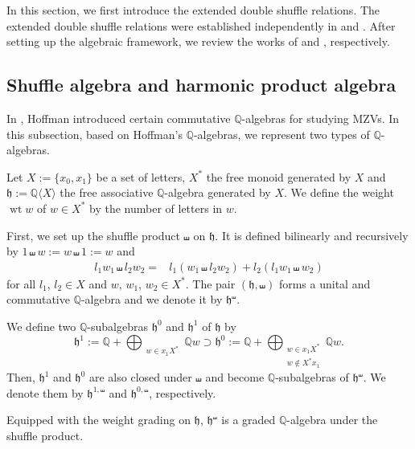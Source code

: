 \documentclass[15pt,oneside,reqno]{amsart}
\theoremstyle{remark}{
\newtheorem{lem}[df]{Lemma}
\newtheorem{prop}[df]{Proposition}
\newtheorem{ex}[df]{Example}
\newtheorem{rmk}[df]{Remark}
}
\DeclareMathOperator{\Span}{Span}
\newcommand{\ide}[1]{\mathfrak{#1}}
\newcommand{\Q}{\mathbb{Q}}
\DeclareMathOperator{\wt}{wt}
\begin{document}
In this section, we first introduce the extended double shuffle relations.
The extended double shuffle relations were established independently in \cite{Ihara-Kaneko-Zagier} and \cite{Racinet}.
After setting up the algebraic framework, we review the works of \cite{Ihara-Kaneko-Zagier} and \cite{Racinet}, respectively.

\subsection{Shuffle algebra and harmonic product algebra}

In \cite{Hoffman}, Hoffman introduced certain commutative $\mathbb{Q}$-algebras for studying MZVs.
In this subsection, based on Hoffman's $\Q$-algebras, we represent two types of $\Q$-algebras.

Let $X := \{x_0,x_1\}$ be a set of letters, $X^*$ the free monoid generated by $X$ and $\ide{h}:= \mathbb{Q}\langle X\rangle$ the free associative $\mathbb{Q}$-algebra generated by $X$.
We define the weight $\wt w$ of $w \in X^*$ by the number of letters in $w$.

First, we set up the shuffle product $\shuffle$ on $\ide{h}$.
It is defined bilinearly and recursively by $1\shuffle w := w \shuffle 1 := w$ and 
\begin{align*}
l_1w_1\shuffle l_2w_2 =& l_1(w_1\shuffle l_2w_2) + l_2(l_1w_1 \shuffle w_2 )
\end{align*}
for all $l_1$, $l_2\in X$ and $w$, $w_1$, $w_2\in X^*$.
The pair $(\ide{h}, \shuffle)$ forms a unital and commutative $\mathbb{Q}$-algebra and we denote it by $\ide{h}^{\shuffle}$.

We define two $\mathbb{Q}$-subalgebras $\ide{h}^0$ and $\ide{h}^1$ of $\ide{h}$ by
\[
\ide{h}^1:= \mathbb{Q} + \bigoplus_{\substack{w\in x_{1}X^*}} \mathbb{Q} w
\supset
\ide{h}^0 := \mathbb{Q} +  \bigoplus_{\substack{w\in x_{1}X^*\\  w\notin X^*x_1 }} \mathbb{Q} w.
\]
Then, $\ide{h}^1$ and $\ide{h}^0$ are also closed under $\shuffle$ and become $\mathbb{Q}$-subalgebras of $\ide{h}^{\shuffle}$.
We denote them by $\ide{h}^{1,\shuffle}$ and $\ide{h}^{0,\shuffle}$, respectively.
\begin{rmk}{}{}
Equipped with the weight grading on $\ide{h}$, $\ide{h}^{\shuffle}$ is a graded $\mathbb{Q}$-algebra under the shuffle product.
\end{rmk}
\end{document}
